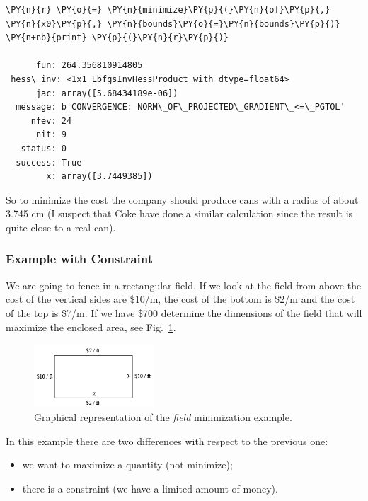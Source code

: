     \begin{tcolorbox}[breakable, size=fbox, boxrule=1pt, pad at break*=1mm,colback=cellbackground, colframe=cellborder]
\begin{Verbatim}[commandchars=\\\{\}]
\PY{n}{r} \PY{o}{=} \PY{n}{minimize}\PY{p}{(}\PY{n}{of}\PY{p}{,} \PY{n}{x0}\PY{p}{,} \PY{n}{bounds}\PY{o}{=}\PY{n}{bounds}\PY{p}{)}
\PY{n+nb}{print} \PY{p}{(}\PY{n}{r}\PY{p}{)}

      fun: 264.356810914805
 hess\_inv: <1x1 LbfgsInvHessProduct with dtype=float64>
      jac: array([5.68434189e-06])
  message: b'CONVERGENCE: NORM\_OF\_PROJECTED\_GRADIENT\_<=\_PGTOL'
     nfev: 24
      nit: 9
   status: 0
  success: True
        x: array([3.7449385])
    \end{Verbatim}
\end{tcolorbox}

    So to minimize the cost the company should produce cans with a radius of
about 3.745 cm (I suspect that Coke have done a similar calculation since the result is quite close to a real can).

\subsubsection{Example with Constraint}\label{example-with-constraint}

We are going to fence in a rectangular field. If we look at the field
from above the cost of the vertical sides are \$10/m, the cost of the
bottom is \$2/m and the cost of the top is \$7/m. If we have \$700 determine
the dimensions of the field that will maximize the enclosed area, see Fig.~\ref{fig:field}.

\begin{figure}[h]
\centering
\includegraphics[width=0.4\textwidth]{figures/field.png}
\caption{Graphical representation of the \emph{field} minimization example.}
\label{fig:field}
\end{figure}

In this example there are two differences with respect to the previous one:

\begin{itemize}
\tightlist
\item
  we want to maximize a quantity (not minimize);
\item
  there is a constraint (we have a limited amount of money).
\end{itemize}

